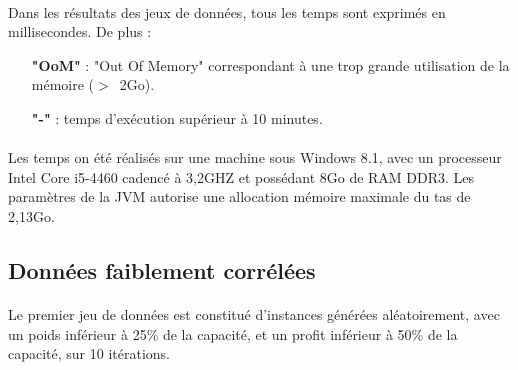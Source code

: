 \documentclass[12pt]{article}
\begin{document}
\paragraph{}Dans les résultats des jeux de données, tous les temps sont exprimés en millisecondes. De plus :
\begin{itemize}
 \item[\textbf{"OoM"}] : "Out Of Memory" correspondant à une trop grande utilisation de la mémoire ($>$~2Go).
 \item[\textbf{"-"}] : temps d'exécution supérieur à 10 minutes.
 \end{itemize}
 
 \paragraph{}Les temps on été réalisés sur une machine sous Windows 8.1, avec un processeur Intel Core i5-4460 cadencé à 3,2GHZ et possédant 8Go de RAM DDR3. Les paramètres de la JVM autorise une allocation mémoire maximale du tas de 2,13Go.

\subsection{Données faiblement corrélées}

\paragraph{}Le premier jeu de données est constitué d'instances générées aléatoirement, avec un poids inférieur à 25\% de la capacité, et un profit inférieur à 50\% de la capacité, sur 10 itérations.
\end{document}
